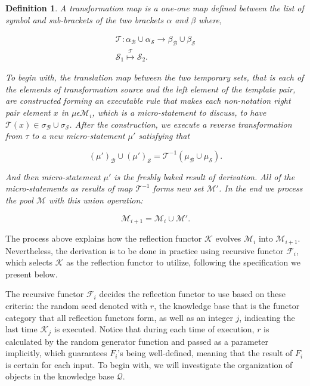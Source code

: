 \documentclass{aims}
\numberwithin{equation}{section}
\newtheorem{definition}{Definition}	%
\numberwithin{theorem}{section}	%
\numberwithin{axiom}{section}	%
\numberwithin{definition}{section}	%
\begin{document}
	\begin{definition}
		A{ transformation map} is a one-one map defined between the list of symbol and sub-brackets of the two brackets \(\alpha\) and \(\beta\) where,
		
		\begin{equation}
			\begin{gathered}
				\mathcal{T}:\alpha _{\mathcal{B}}\cup \alpha _{\mathcal{S}}\to \beta _{\mathcal{B}}\cup \beta _{\mathcal{S}}\\
				\mathcal{S}_1\overset{\mathcal{T}}{\mapsto }\mathcal{S}_2.
			\end{gathered}
		\end{equation}
		
		To begin with, the translation map between the two temporary sets, that is each of the elements of transformation source and the left element of the template pair, are constructed forming an executable rule that makes each non-notation right pair element \(x\) in \(\mu \epsilon \mathcal{M}_i\), which is a micro-statement to discuss, to have \(\mathcal{T}(x)\in \sigma _{\mathcal{B}}\cup \sigma _{\mathcal{S}}\). After the construction, we execute a{ reverse transformation } from \(\tau\) to a new micro-statement \(\mu '\) satisfying that
		
		\begin{equation}
			(\mu ')_{\mathcal{B}}\cup (\mu ')_{\mathcal{S}} =\mathcal{T}^{-1}\left(\mu _{\mathcal{B}}\cup \mu _{\mathcal{S}}\right).
		\end{equation}
		
		And then micro-statement \(\mu '\) is the freshly baked result of derivation. All of the micro-statements as results of map \(\mathcal{T}^{-1}\) forms new set \(\mathcal{M}'\). In the end we process the pool \(\mathcal{M}\) with this union operation:
		
		\[\mathcal{M}_{i+1}=\mathcal{M}_i\cup \mathcal{M}'.\]
	\end{definition}
	
	The process above explains how the reflection functor \(\mathcal{K}\) evolves \(\mathcal{M}_i\) into \(\mathcal{M}_{i+1}\). Nevertheless, the derivation is to be done in practice using recursive functor \(\mathcal{F}_i\), which selects \(\mathcal{K}\) as the reflection functor to utilize, following the specification we present below.
	
	The recursive functor \(\mathcal{F}_i\) decides the reflection functor to use based on these criteria: the random seed denoted with \(\mathit{r}\), the knowledge base that is the functor category that all reflection functors form, as well as an integer \(j\), indicating the last time \(\mathcal{K}_j\) is executed. Notice that during each time of execution, \(\mathit{r}\) is calculated by the random generator function and passed as a parameter implicitly, which guarantees \(\mathit{F}_i\)'s being well-defined, meaning that the result of \(\mathit{F}_i\) is certain for each input. To begin with, we will investigate the organization of objects in the knowledge base \(\mathcal{Q}\).
	
\end{document}
